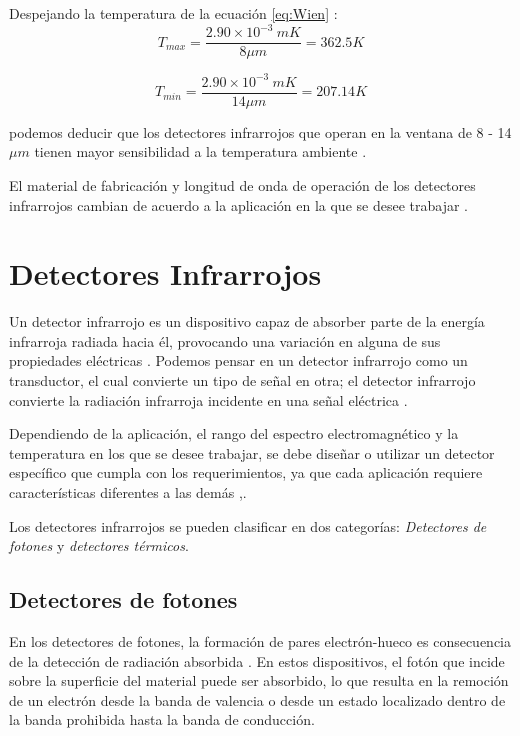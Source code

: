 Despejando la temperatura de la ecuación \ref{eq:Wien} \cite{BlancoMDA}:
    \begin{equation}
        T_{max} = \frac{2.90\times10^{-3}\ mK}{8\mu m} = 362.5K
        \label{eq:tempmax}
    \end{equation}

    \begin{equation}
        T_{min} = \frac{2.90\times10^{-3}\ mK}{14\mu m} = 207.14K
        \label{eq:tempmin}
    \end{equation}

podemos deducir que los detectores infrarrojos que operan en la ventana de 8 - 14 $\mu m$ tienen mayor sensibilidad a la temperatura ambiente \cite{Rogalski}.

El material de fabricación y longitud de onda de operación de los detectores infrarrojos cambian de acuerdo a la aplicación en la que se desee trabajar \cite{Rogalski}.					           
     
    
    \section{Detectores Infrarrojos}
    
    Un detector infrarrojo es un dispositivo capaz de absorber parte de la energía infrarroja radiada hacia él, provocando una variación en alguna de sus propiedades eléctricas \cite{BlancoMDA}. Podemos pensar en un detector infrarrojo como un transductor, el cual convierte un tipo de señal en otra; el detector infrarrojo convierte la radiación infrarroja incidente en una señal eléctrica \cite{Vincent}.
    
    Dependiendo de la aplicación, el rango del espectro electromagnético y la temperatura en los que se desee trabajar, se debe diseñar o utilizar un detector específico que cumpla con los requerimientos, ya que cada aplicación requiere características diferentes a las demás \cite{Rogalski},\cite{BlancoMDA}.
    
    Los detectores infrarrojos se pueden clasificar en dos categorías: \textit{Detectores de fotones} y \textit{detectores térmicos}.
    
		\subsection{Detectores de fotones}
		En los detectores de fotones, la formación de pares electrón-hueco es consecuencia de la detección de radiación absorbida \cite{BlancoMDA}. En estos dispositivos, el fotón que incide sobre la superficie del material puede ser absorbido, lo que resulta en la remoción de un electrón desde la banda de valencia o desde un estado localizado dentro de la banda prohibida hasta la banda de conducción.

